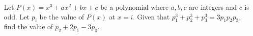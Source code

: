 Let $P(x)=x^3+ax^2+bx+c$ be a polynomial where $a,b,c$ are integers and $c$  is odd. Let $p_{i}$ be the value of $P(x)$ at $x=i$. Given that $p_{1}^3+p_{2}^{3}+p_{3}^{3}=3p_{1}p_{2}p_{3}$, find the value of $p_{2}+2p_{1}-3p_{0}.$
